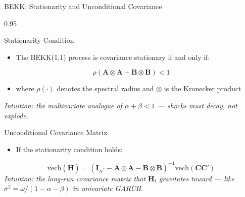 \documentclass[9pt, aspectratio=169, t]{beamer}
\begin{document}
\begin{frame}{BEKK: Stationarity and Unconditional Covariance}
    \begin{cminipage}{0.95\textwidth}
    {\footnotesize
    \begin{block}{Stationarity Condition}
        \begin{itemize}\setlength{\itemsep}{0pt}
            \item The BEKK(1,1) process is covariance stationary if and only if:
        \end{itemize}
        \[
            \rho(\mathbf{A} \otimes \mathbf{A} + \mathbf{B} \otimes \mathbf{B}) < 1
        \]
        \begin{itemize}\setlength{\itemsep}{0pt}
            \item where $\rho(\cdot)$ denotes the spectral radius and $\otimes$ is the Kronecker product
        \end{itemize}
        \textit{Intuition: the multivariate analogue of $\alpha + \beta < 1$ --- shocks must decay, not explode.}
    \end{block}
    \vspace{0.1cm}
    \begin{block}{Unconditional Covariance Matrix}
        \begin{itemize}\setlength{\itemsep}{0pt}
            \item If the stationarity condition holds:
        \end{itemize}
        \[
            \text{vech}(\bar{\mathbf{H}}) = (\mathbf{I}_{N^*} - \mathbf{A} \otimes \mathbf{A} - \mathbf{B} \otimes \mathbf{B})^{-1} \text{vech}(\mathbf{C}\mathbf{C}')
        \]
        \textit{Intuition: the long-run covariance matrix that $\mathbf{H}_t$ gravitates toward --- like $\bar{\sigma}^2 = \omega/(1-\alpha-\beta)$ in univariate GARCH.}
    \end{block}
    }
    \end{cminipage}
\end{frame}
\end{document}
